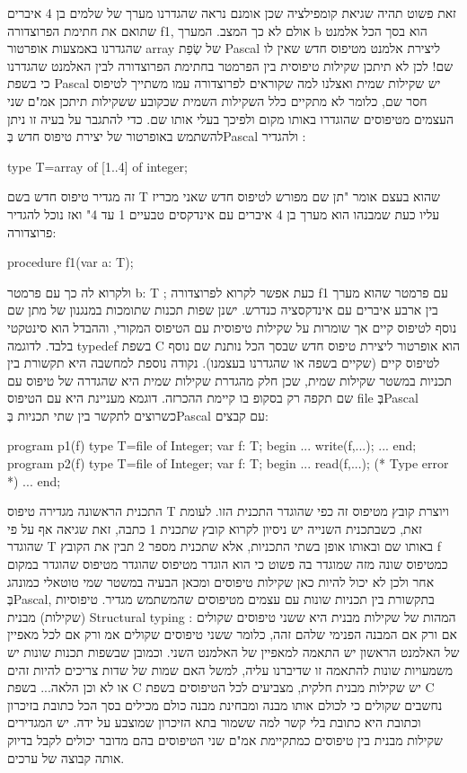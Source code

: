       זאת פשוט תהיה שגיאת קומפילציה שכן אומנם נראה שהגדרנו מערך של שלמים בן 4 איברים שתואם את חתימת הפרוצדורה f1, אולם לא כך המצב. המערך b הוא בסך הכל אלמנט שהגדרנו באמצעות אופרטור array של שְׂפַת Pascal ליצירת אלמנט מטיפוס חדש שאין לו שם! לכן לא תיתכן שקילות טיפוסית בין הפרמטר בחתימת הפרוצדורה לבין האלמנט שהגדרנו כי בשפת Pascal יש שקילות שמית ואצלנו למה שקוראים לפרוצדורה עמו משתייך לטיפוס חסר שם, כלומר לא מתקיים כלל השקילות השמית שכקובע ששקילות תיתכן אמ"ם שני העצמים מטיפוסים שהוגדרו באותו מקום ולפיכך בעלי אותו שם.
      כדי להתגבר על בעיה זו ניתן להשתמש באופרטור של יצירת טיפוס חדש בְּPascal ולהגדיר :

      type T=array of [1..4] of integer;

      זה מגדיר טיפוס חדש בשם T שהוא בעצם אומר "תן שם מפורש לטיפוס חדש שאני מכריז עליו כעת שמבנהו הוא מערך בן 4 איברים עם אינדקסים טבעיים 1 עד 4" ואז נוכל להגדיר פרוצדורה:

      procedure f1(var a: T);

      ולקרוא לה כך עם פרמטר
      b: T ;
      כעת אפשר לקרוא לפרוצדורה f1 עם פרמטר שהוא מערך בין ארבע איברים עם אינדקסציה
      כנדרש. ישנן שפות תכנות שתומכות במנגנון של מתן שם נוסף לטיפוס קיים אך שומרות על
      שקילות טיפוסית עם הטיפוס המקורי, וההבדל הוא סינטקטי בלבד. לדוגמה typedef בשפת C
      הוא אופרטור ליצירת טיפוס חדש שבסך הכל נותנת שם נוסף לטיפוס קיים (שקיים בשפה או
      שהגדרנו בעצמנו). נקודה נוספת למחשבה היא תקשורת בין תכניות במשטר שקילות שמית,
      שכן חלק מהגדרת שקילות שמית היא שהגדרה של טיפוס עם שם תקפה רק בסקופ בו קיימת
      ההכרזה. דוגמא מעניינת היא עם הטיפוס file בְּPascal כשרוצים לתקשר בין שתי תכניות
      בְּPascal עם קבצים:

\begin{PASCAL}
program p1(f)
type T=file of Integer;
var f: T;
begin
...
write(f,...);
...
end;
  program p2(f)
type T=file of Integer;
var f: T;
begin
...
read(f,...); (* Type error *)
...
end;
\end{PASCAL}

      התכנית הראשונה מגדירה טיפוס T ויוצרת קובץ מטיפוס זה כפי שהוגדר התכנית הזו.
      לעומת זאת, כשבתכנית השנייה יש ניסיון לקרוא קובץ שתכנית 1 כתבה, זאת שגיאה אף על
      פי שהוגדר T באותו שם ובאותו אופן בשתי התכניות, אלא שתכנית מספר 2 תבין את הקובץ
      f כמטיפוס שונה מזה שמוגדר בה פשוט כי הוא הוגדר מטיפוס שהוגדר מטיפוס שהוגדר
      במקום אחר ולכן לא יכול להיות כאן שקילות טיפוסים ומכאן הבעיה במשטר שמי טוטאלי
      כמונהג בְּPascal, בתקשורת בין תכניות שונות עם עצמים מטיפוסים שהמשתמש מגדיר.
      טיפוסיות (שקילות) מבנית Structural typing :
      המהות של שקילות מבנית היא ששני טיפוסים שקולים אם ורק אם המבנה הפנימי שלהם זהה, כלומר ששני טיפוסים שקולים אמ ורק אם לכל מאפיין של האלמנט הראשון יש התאמה למאפיין של האלמנט השני. וכמובן שבשפות תכנות שונות יש משמעויות שונות להתאמה זו שדיברנו עליה, למשל האם שמות של שדות צריכים להיות זהים או לא וכן הלאה...
      בשפת C יש שקילות מבנית חלקית, מצביעים לכל הטיפוסים בשפת C נחשבים שקולים כי לכולם אותו מבנה ומבחינת מבנה כולם מכילים בסך הכל כתובת בזיכרון וכתובת היא כתובת בלי קשר למה ששמור בתא הזיכרון שמוצבע על ידה.
      יש המגדירים שקילות מבנית בין טיפוסים כמתקיימת אמ"ם שני הטיפוסים בהם מדובר יכולים לקבל בדיוק אותה קבוצה של ערכים.

